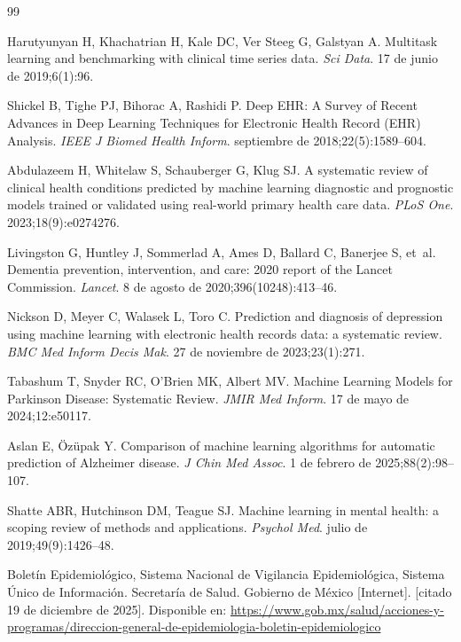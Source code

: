\documentclass[12pt,a4paper]{article}
\begin{document}
\begin{thebibliography}{99}

Harutyunyan H, Khachatrian H, Kale DC, Ver Steeg G, Galstyan A.
Multitask learning and benchmarking with clinical time series data.
\textit{Sci Data}. 17 de junio de 2019;6(1):96.

Shickel B, Tighe PJ, Bihorac A, Rashidi P.
Deep EHR: A Survey of Recent Advances in Deep Learning Techniques for Electronic Health Record (EHR) Analysis.
\textit{IEEE J Biomed Health Inform}. septiembre de 2018;22(5):1589--604.

Abdulazeem H, Whitelaw S, Schauberger G, Klug SJ.
A systematic review of clinical health conditions predicted by machine learning diagnostic and prognostic models trained or validated using real-world primary health care data.
\textit{PLoS One}. 2023;18(9):e0274276.

Livingston G, Huntley J, Sommerlad A, Ames D, Ballard C, Banerjee S, et~al.
Dementia prevention, intervention, and care: 2020 report of the Lancet Commission.
\textit{Lancet}. 8 de agosto de 2020;396(10248):413--46.

Nickson D, Meyer C, Walasek L, Toro C.
Prediction and diagnosis of depression using machine learning with electronic health records data: a systematic review.
\textit{BMC Med Inform Decis Mak}. 27 de noviembre de 2023;23(1):271.

Tabashum T, Snyder RC, O'Brien MK, Albert MV.
Machine Learning Models for Parkinson Disease: Systematic Review.
\textit{JMIR Med Inform}. 17 de mayo de 2024;12:e50117.

Aslan E, Özüpak Y.
Comparison of machine learning algorithms for automatic prediction of Alzheimer disease.
\textit{J Chin Med Assoc}. 1 de febrero de 2025;88(2):98--107.

Shatte ABR, Hutchinson DM, Teague SJ.
Machine learning in mental health: a scoping review of methods and applications.
\textit{Psychol Med}. julio de 2019;49(9):1426--48.

Boletín Epidemiológico, Sistema Nacional de Vigilancia Epidemiológica, Sistema Único de Información. Secretaría de Salud. Gobierno de México [Internet]. [citado 19 de diciembre de 2025]. Disponible en: \url{https://www.gob.mx/salud/acciones-y-programas/direccion-general-de-epidemiologia-boletin-epidemiologico}


\end{thebibliography}
\end{document}
